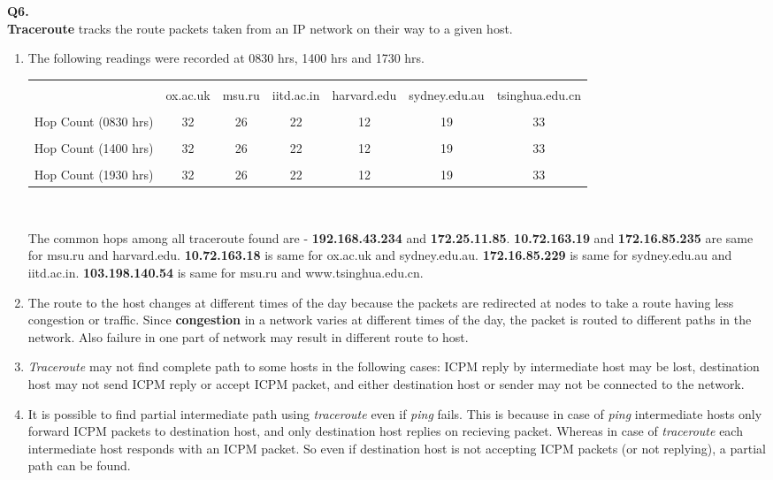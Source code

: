 \documentclass[12pt]{report}
\begin{document}
	\vspace*{10px}
	\large{\textbf{Q6.}}\\
	\linebreak[1]
	\normalsize{}
	\hspace*{1cm} \textbf{Traceroute} tracks the route packets taken from an IP network on their way to a given host.
	\begin{enumerate}[label=\textbf{(\alph*)}]
		\item The following readings were recorded at 0830 hrs, 1400 hrs and 1730 hrs.
		\begin{center}
			\begin{tabular}{| c | c | c | c | c | c | c |}
				\hline
				&&&&&&\\[1pt]
				& ox.ac.uk & msu.ru & iitd.ac.in & harvard.edu & sydney.edu.au & tsinghua.edu.cn\\[1pt]
				\hline
				&&&&&&\\[1pt]
				Hop Count (0830 hrs) & 32 & 26 & 22 & 12 & 19 & 33 \\[1pt]
				\hline
				&&&&&&\\[1pt]
				Hop Count (1400 hrs) & 32 & 26 & 22 & 12 & 19 & 33 \\[1pt]
				\hline
				&&&&&&\\[1pt]
				Hop Count (1930 hrs) & 32 & 26 & 22 & 12 & 19 & 33 \\[1pt]
				\hline
			\end{tabular}
		\\[5pt]
		\end{center}
	
	The common hops among all traceroute found are - \textbf{192.168.43.234} and \textbf{172.25.11.85}. \textbf{10.72.163.19} and \textbf{172.16.85.235} are same for msu.ru and harvard.edu. \textbf{10.72.163.18} is same for  ox.ac.uk and sydney.edu.au. \textbf{172.16.85.229} is same for sydney.edu.au and iitd.ac.in.
	\textbf{103.198.140.54} is same for msu.ru and www.tsinghua.edu.cn.
	
	\item The route to the host changes at different times of the day because the packets are redirected at nodes to take a route having less congestion or traffic. Since \textbf{congestion} in a network varies at different times of the day, the packet is routed to different paths in the network. Also failure in one part of network may result in different route to host.
	
	\item  \textit{Traceroute} may not find complete path to some hosts in the following cases: ICPM reply by intermediate host may be lost, destination host may not send ICPM reply or accept ICPM packet, and either destination host or sender may not be connected to the network.
	\item It is possible to find partial intermediate path using \textit{traceroute} even if \textit{ping} fails. This is because in case of \textit{ping} intermediate hosts only forward ICPM packets to destination host, and only destination host replies on recieving packet. Whereas in case of \textit{traceroute} each intermediate host responds with an ICPM packet. So even if destination host is not accepting ICPM packets (or not replying), a partial path can be found.
	\end{enumerate}
\end{document}
